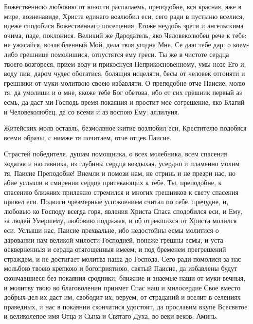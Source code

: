  






Божественною любовию от юности распалаемь, преподобне, вся красная, яже в мире, возненавиде, Христа единаго возлюбил еси, сего ради в пустыню вселися, идеже сподобися Божественнаго посещения, Егоже неудобь зрети и ангельскима очима, паде, поклонися. Великий же Дародатель, яко Человеколюбец рече к тебе: не ужасайся, возлюбленный Мой, дела твоя угодна Мне. Се даю тебе дар: о коем-либо грешнице помолишися, отпустятся ему греси. Ты же в чистоте сердца твоего возгореся, прием воду и прикоснуся Неприкосновенному, умы нозе Его и, воду пив, даром чудес обогатися, болящия исцеляти, бесы от человек отгоняти и грешники от муки молитвою своею избавляти. О преподобне отче Паисие, молю тя, да умолиши и о мне, якоже тебе Бог обетова, ибо от сих грешник первый аз есмь, да даст ми Господь время покаяния и простит мое согрешение, яко Благий и Человеколюбец, да со всеми и аз воспою Ему: аллилуия.





Житейских молв оставль, безмолвное житие возлюбил еси, Крестителю подобяся всеми образы, с нимже тя почитаем, отче отцев Паисие.




Страстей победителя, душам помощника, о всех молебника, всем спасения ходатая и наставника, из глубины сердца воздыхая, усердно и пламенно молим тя, Паисие Преподобне! Внемли и помози нам, не отринь и не презри нас, но абие услыши в смирении сердца притекающих к тебе. Ты, преподобне, к спасению ближних прилежно стремился и многих грешников к свету спасения привел еси. Подвиги чрезмерные успокоением считал по себе, пречудне, и, любовью ко Господу всегда горя, явления Христа Спаса сподобился еси, и Ему, за людей Умершему, любовию подражая, и об отрекшихся от Христа молился еси. Услыши нас, Паисие прехвальне, ибо недостойны есмы молитися о даровании нам великой милости Господней, понеже грешны есмы, и уста оскверненныя и сердца отягощенныя имеем, и под бременем прегрешений страждем, и не достигает молитва наша до Господа. Сего ради помолися за нас мольбою твоею крепкою и богоприятною, святый Паисие, да избавлены будут скончавшиеся без покаяния сродники, ближние и знаемые наши от муки вечныя, и молитву твою во благоволении приимет Спас наш и милосердие Свое вместо добрых дел их даст им, свободит их, веруем, от страданий и вселит в селениях праведных, и нас в покаянии скончатися удостоит, да прославим вкупе Всесвятое и великолепое имя Отца и Сына и Святаго Духа, во веки веков. Аминь.
\mychapterending

